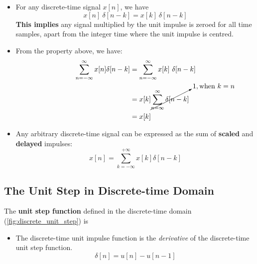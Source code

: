 \begin{itemize}
    \item For any discrete-time signal $x[n]$, we have
    \[ x[n] \ \delta[n-k] = x[k] \ \delta[n-k] \]
    \textbf{This implies} any signal multiplied by the unit impulse is zeroed for all time samples, apart from the integer time where the unit impulse is centred.
    
    \item From the property above, we have:
     \begin{align*} 
     \begin{split}
         \sum_{n=-\infty}^{\infty}x[n]\delta[n-k]  
         &= \sum_{n=-\infty}^{\infty}x[k] \ \delta[n-k] \\
         &= x[k] \cancelto{1, \text{when} \ k=n}{\sum_{n=\infty}^{\infty}\delta[n-k]} \\
         &= x[k]
     \end{split} 
     \end{align*}
     
    \item Any arbitrary discrete-time signal can be expressed as the sum of \textbf{scaled} and \textbf{delayed} impulses:
    \[ x[n] = \sum_{k=-\infty}^{+\infty}x[k]\delta[n-k] \] 
\end{itemize}

\subsection{The Unit Step in Discrete-time Domain}
The \textbf{unit step function} defined in the discrete-time domain (\autoref{fig:discrete_unit_step}) is\\
\begin{itemize}
    \item The discrete-time unit impulse function is the \textit{derivative} of the discrete-time unit step function.
    \[ \delta[n] = u[n] - u[n-1] \]
\end{itemize}

